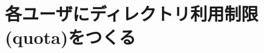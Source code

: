 \documentclass{jreport}
\begin{document}










\section{各ユーザにディレクトリ利用制限(quota)をつくる}
\end{document}
